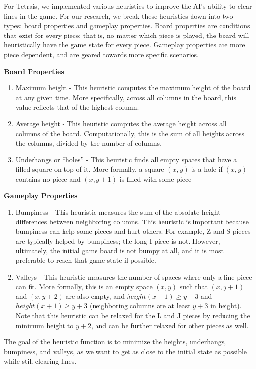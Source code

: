\documentclass[12pt]{article}
\begin{document}
For Tetrais, we implemented various heuristics to improve the AI’s ability to clear lines in the game. For our research, we break these heuristics down into two types: board properties and gameplay properties. Board properties are conditions that exist for every piece; that is, no matter which piece is played, the board will heuristically have the game state for every piece. Gameplay properties are more piece dependent, and are geared towards more specific scenarios.

\textbf{Board Properties}
\begin{enumerate}
\item Maximum height - This heuristic computes the maximum height of the board at any given time. More specifically, across all columns in the board, this value reflects that of the highest column.
\item Average height - This heuristic computes the average height across all columns of the board. Computationally, this is the sum of all heights across the columns, divided by the number of columns.
\item Underhangs or ``holes'' - This heuristic finds all empty spaces that have a filled square on top of it. More formally, a square $(x,y)$ is a hole if $(x,y)$ contains no piece and $(x, y+1)$ is filled with some piece.
\end{enumerate}

\textbf{Gameplay Properties}
\begin{enumerate}
\item Bumpiness - This heuristic measures the sum of the absolute height differences between neighboring columns. This heuristic is important because bumpiness can help some pieces and hurt others. For example, Z and S pieces are typically helped by bumpiness; the long I piece is not. However, ultimately, the initial game board is not bumpy at all, and it is most preferable to reach that game state if possible.
\item Valleys - This heuristic measures the number of spaces where only a line piece can fit. More formally, this is an empty space $(x, y)$ such that $(x, y+1)$ and $(x, y+2)$ are also empty, and $height(x-1) \geq y+3$ and $height(x+1) \geq y+3$ (neighboring columns are at least $y+3$ in height). Note that this heuristic can be relaxed for the L and J pieces by reducing the minimum height to $y+2$, and can be further relaxed for other pieces as well.
\end{enumerate}

The goal of the heuristic function is to minimize the heights, underhangs, bumpiness, and valleys, as we want to get as close to the initial state as possible while still clearing lines.
\end{document}
